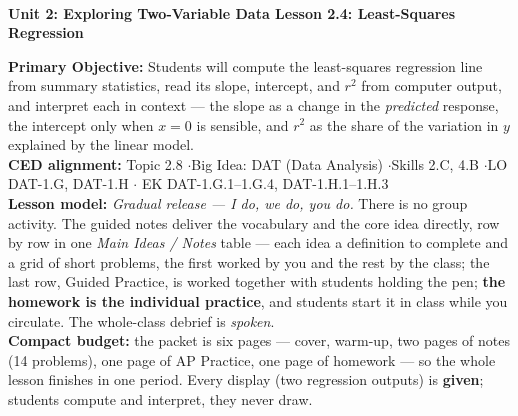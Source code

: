 \documentclass[10pt]{article}
\newcommand{\UnitNumberName}{Unit 2: Exploring Two-Variable Data \quad}
\newcommand{\LessonNumberName}{Lesson 2.4: Least-Squares Regression}
\begin{document}
\begin{center}
    {\Large\bfseries \CourseName \\
    {\small\bfseries \UnitNumberName \LessonNumberName}}
\end{center}

\begin{tcolorbox}[colback=sky, colframe=navy, boxrule=0.9pt, arc=2mm,
    left=2mm, right=2mm, top=1.5mm, bottom=1.5mm]
    \textbf{Primary Objective:} Students will compute the least-squares regression line from
    summary statistics, read its slope, intercept, and $r^2$ from computer output, and interpret
    each in context --- the slope as a change in the \emph{predicted} response, the intercept
    only when $x = 0$ is sensible, and $r^2$ as the share of the variation in $y$ explained by
    the linear model.
    \\[2pt]
    \textbf{CED alignment:} Topic 2.8 \quad$\cdot$\quad Big Idea: DAT (Data Analysis)
    \quad$\cdot$\quad Skills 2.C, 4.B \quad$\cdot$\quad LO DAT-1.G, DAT-1.H \quad$\cdot$\quad
    EK DAT-1.G.1--1.G.4, DAT-1.H.1--1.H.3
    \\[2pt]
    \textbf{Lesson model:} \emph{Gradual release --- I do, we do, you do.} There is no group
    activity. The guided notes deliver the vocabulary and the core idea directly, row by row
    in one \emph{Main Ideas / Notes} table --- each idea a definition to complete and a grid of
    short problems, the first worked by you and the rest by the class; the last row, Guided
    Practice, is worked together with students holding the pen;
    \textbf{the homework is the individual practice}, and students start it in class while you
    circulate. The whole-class debrief is \emph{spoken}.
    \\[2pt]
    \textbf{Compact budget:} the packet is six pages --- cover, warm-up, two pages of notes (14
    problems), one page of AP Practice, one page of homework --- so the whole lesson finishes in
    one period. Every display (two regression outputs) is \textbf{given}; students compute and
    interpret, they never draw.
\end{tcolorbox}
\end{document}
